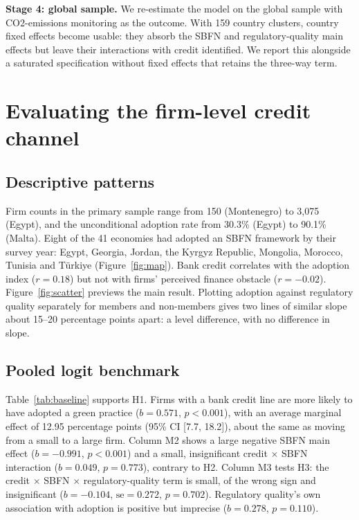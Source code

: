 \documentclass[review,authoryear,12pt]{elsarticle}
\begin{document}
\textbf{Stage 4: global sample.} We re-estimate the model on the global sample with CO2-emissions monitoring as the outcome. With 159 country clusters, country fixed effects become usable: they absorb the SBFN and regulatory-quality main effects but leave their interactions with credit identified. We report this alongside a saturated specification without fixed effects that retains the three-way term.

\section{Evaluating the firm-level credit channel}
\label{sec:results}

\subsection{Descriptive patterns}
\label{sec:descriptive}

Firm counts in the primary sample range from 150 (Montenegro) to 3{,}075 (Egypt), and the unconditional adoption rate from 30.3\% (Egypt) to 90.1\% (Malta). Eight of the 41 economies had adopted an SBFN framework by their survey year: Egypt, Georgia, Jordan, the Kyrgyz Republic, Mongolia, Morocco, Tunisia and Türkiye (Figure~\ref{fig:map}). Bank credit correlates with the adoption index ($r=0.18$) but not with firms' perceived finance obstacle ($r=-0.02$). Figure~\ref{fig:scatter} previews the main result. Plotting adoption against regulatory quality separately for members and non-members gives two lines of similar slope about 15--20 percentage points apart: a level difference, with no difference in slope.

\subsection{Pooled logit benchmark}
\label{sec:baseline}

Table~\ref{tab:baseline} supports H1. Firms with a bank credit line are more likely to have adopted a green practice ($b=0.571$, $p<0.001$), with an average marginal effect of 12.95 percentage points (95\% CI [7.7, 18.2]), about the same as moving from a small to a large firm. Column M2 shows a large negative SBFN main effect ($b=-0.991$, $p<0.001$) and a small, insignificant credit $\times$ SBFN interaction ($b=0.049$, $p=0.773$), contrary to H2. Column M3 tests H3: the credit $\times$ SBFN $\times$ regulatory-quality term is small, of the wrong sign and insignificant ($b=-0.104$, $\text{se}=0.272$, $p=0.702$). Regulatory quality's own association with adoption is positive but imprecise ($b=0.278$, $p=0.110$).
\end{document}
